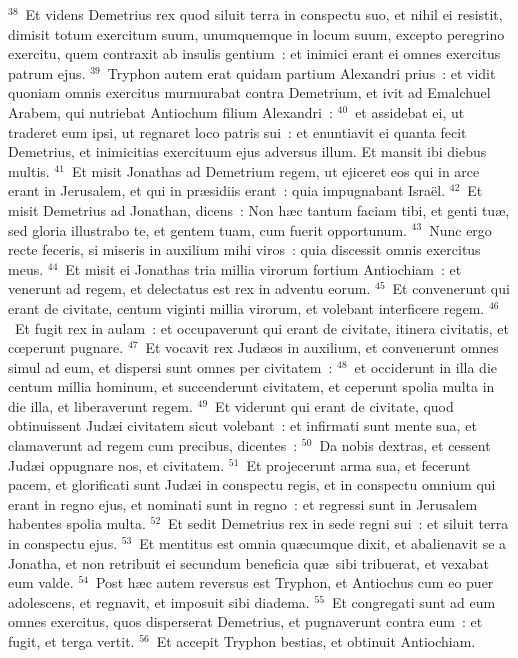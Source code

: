 ${}^{38}$~Et videns Demetrius rex quod siluit terra in conspectu suo, et nihil ei resistit, dimisit totum exercitum suum, unumquemque in locum suum, excepto peregrino exercitu, quem contraxit ab insulis gentium~: et inimici erant ei omnes exercitus patrum ejus.
${}^{39}$~Tryphon autem erat quidam partium Alexandri prius~: et vidit quoniam omnis exercitus murmurabat contra Demetrium, et ivit ad Emalchuel Arabem, qui nutriebat Antiochum filium Alexandri~:
${}^{40}$~et assidebat ei, ut traderet eum ipsi, ut regnaret loco patris sui~: et enuntiavit ei quanta fecit Demetrius, et inimicitias exercituum ejus adversus illum. Et mansit ibi diebus multis.
${}^{41}$~Et misit Jonathas ad Demetrium regem, ut ejiceret eos qui in arce erant in Jerusalem, et qui in pr\ae sidiis erant~: quia impugnabant Isra\"el.
${}^{42}$~Et misit Demetrius ad Jonathan, dicens~: Non h\ae c tantum faciam tibi, et genti tu\ae , sed gloria illustrabo te, et gentem tuam, cum fuerit opportunum.
${}^{43}$~Nunc ergo recte feceris, si miseris in auxilium mihi viros~: quia discessit omnis exercitus meus.
${}^{44}$~Et misit ei Jonathas tria millia virorum fortium Antiochiam~: et venerunt ad regem, et delectatus est rex in adventu eorum.
${}^{45}$~Et convenerunt qui erant de civitate, centum viginti millia virorum, et volebant interficere regem.
${}^{46}$~Et fugit rex in aulam~: et occupaverunt qui erant de civitate, itinera civitatis, et cœperunt pugnare.
${}^{47}$~Et vocavit rex Jud\ae os in auxilium, et convenerunt omnes simul ad eum, et dispersi sunt omnes per civitatem~:
${}^{48}$~et occiderunt in illa die centum millia hominum, et succenderunt civitatem, et ceperunt spolia multa in die illa, et liberaverunt regem.
${}^{49}$~Et viderunt qui erant de civitate, quod obtinuissent Jud\ae i civitatem sicut volebant~: et infirmati sunt mente sua, et clamaverunt ad regem cum precibus, dicentes~:
${}^{50}$~Da nobis dextras, et cessent Jud\ae i oppugnare nos, et civitatem.
${}^{51}$~Et projecerunt arma sua, et fecerunt pacem, et glorificati sunt Jud\ae i in conspectu regis, et in conspectu omnium qui erant in regno ejus, et nominati sunt in regno~: et regressi sunt in Jerusalem habentes spolia multa.
${}^{52}$~Et sedit Demetrius rex in sede regni sui~: et siluit terra in conspectu ejus.
${}^{53}$~Et mentitus est omnia qu\ae cumque dixit, et abalienavit se a Jonatha, et non retribuit ei secundum beneficia qu\ae\ sibi tribuerat, et vexabat eum valde.
${}^{54}$~Post h\ae c autem reversus est Tryphon, et Antiochus cum eo puer adolescens, et regnavit, et imposuit sibi diadema.
${}^{55}$~Et congregati sunt ad eum omnes exercitus, quos disperserat Demetrius, et pugnaverunt contra eum~: et fugit, et terga vertit.
${}^{56}$~Et accepit Tryphon bestias, et obtinuit Antiochiam.


